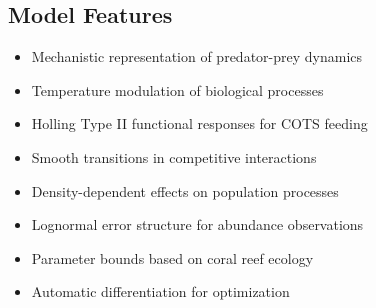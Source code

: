 \documentclass{article}
\begin{document}
\subsection{Model Features}
\begin{itemize}
\item Mechanistic representation of predator-prey dynamics
\item Temperature modulation of biological processes
\item Holling Type II functional responses for COTS feeding
\item Smooth transitions in competitive interactions
\item Density-dependent effects on population processes
\item Lognormal error structure for abundance observations
\item Parameter bounds based on coral reef ecology
\item Automatic differentiation for optimization
\end{itemize}
\end{document}
